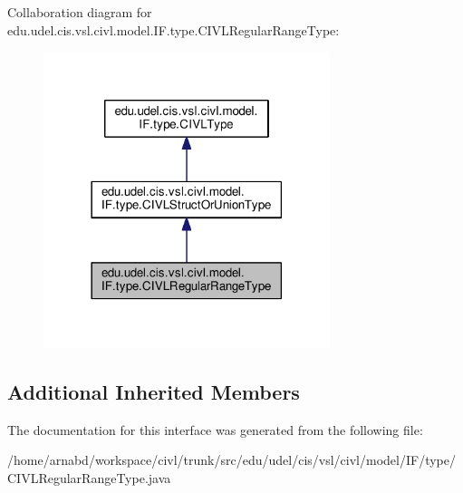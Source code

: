 Collaboration diagram for edu.\+udel.\+cis.\+vsl.\+civl.\+model.\+I\+F.\+type.\+C\+I\+V\+L\+Regular\+Range\+Type\+:
\nopagebreak
\begin{figure}[H]
\begin{center}
\leavevmode
\includegraphics[width=237pt]{interfaceedu_1_1udel_1_1cis_1_1vsl_1_1civl_1_1model_1_1IF_1_1type_1_1CIVLRegularRangeType__coll__graph}
\end{center}
\end{figure}
\subsection*{Additional Inherited Members}


The documentation for this interface was generated from the following file\+:\begin{DoxyCompactItemize}
\item 
/home/arnabd/workspace/civl/trunk/src/edu/udel/cis/vsl/civl/model/\+I\+F/type/C\+I\+V\+L\+Regular\+Range\+Type.\+java\end{DoxyCompactItemize}
